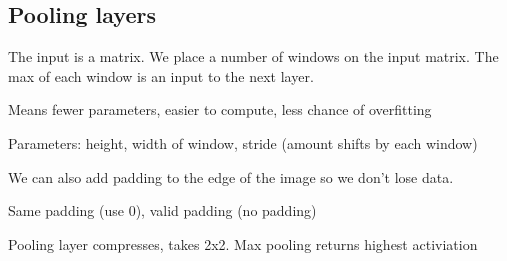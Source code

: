 
\subsection{Pooling layers}

The input is a matrix. We place a number of windows on the input matrix. The max of each window is an input to the next layer.

Means fewer parameters, easier to compute, less chance of overfitting

Parameters: height, width of window, stride (amount shifts by each window)

We can also add padding to the edge of the image so we don't lose data.

Same padding (use 0), valid padding (no padding)

Pooling layer compresses, takes 2x2. Max pooling returns highest activiation

